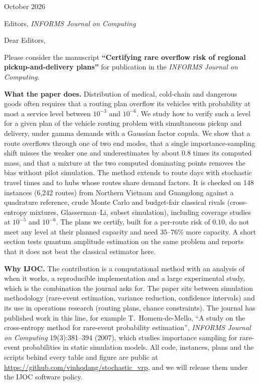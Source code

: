\documentclass[10pt]{article}
\begin{document}
October 2026

Editors, \emph{INFORMS Journal on Computing}

Dear Editors,

Please consider the manuscript \textbf{``Certifying rare overflow risk of regional pickup-and-delivery plans''} for publication in the \emph{INFORMS Journal on Computing}.

\textbf{What the paper does.} Distribution of medical, cold-chain and dangerous goods often requires that a routing plan overflow its vehicles with probability at most a service level between $10^{-3}$ and $10^{-6}$. We study how to verify such a level for a given plan of the vehicle routing problem with simultaneous pickup and delivery, under gamma demands with a Gaussian factor copula. We show that a route overflows through one of two end modes, that a single importance-sampling shift misses the weaker one and underestimates by about $0.8$ times its computed mass, and that a mixture at the two computed dominating points removes the bias without pilot simulation. The method extends to route days with stochastic travel times and to hubs whose routes share demand factors. It is checked on 148 instances (6,242 routes) from Northern Vietnam and Guangdong against a quadrature reference, crude Monte Carlo and budget-fair classical rivals (cross-entropy mixtures, Glasserman--Li, subset simulation), including coverage studies at $10^{-5}$ and $10^{-6}$. The plans we certify, built for a per-route risk of $0.10$, do not meet any level at their planned capacity and need $35$--$76\%$ more capacity. A short section tests quantum amplitude estimation on the same problem and reports that it does not beat the classical estimator here.

\textbf{Why IJOC.} The contribution is a computational method with an analysis of when it works, a reproducible implementation and a large experimental study, which is the combination the journal asks for. The paper sits between simulation methodology (rare-event estimation, variance reduction, confidence intervals) and its use in operations research (routing plans, chance constraints). The journal has published work in this line, for example T.\ Homem-de-Mello, ``A study on the cross-entropy method for rare-event probability estimation'', \emph{INFORMS Journal on Computing} 19(3):381--394 (2007), which studies importance sampling for rare-event probabilities in static simulation models. All code, instances, plans and the scripts behind every table and figure are public at \url{https://github.com/vinhqdang/stochastic_vrp}, and we will release them under the IJOC software policy.
\end{document}
